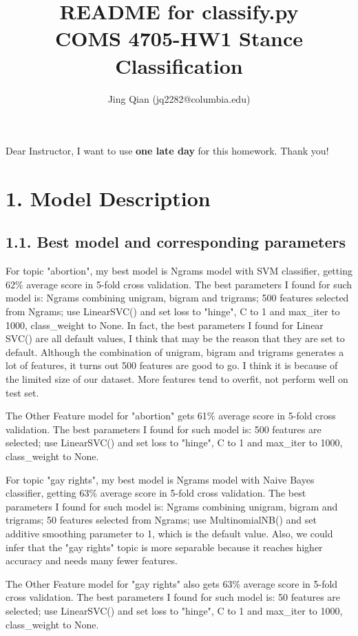 \documentclass{article}
\title{README for classify.py\\COMS 4705-HW1 Stance Classification}
\author{Jing Qian (jq2282@columbia.edu)}
\begin{document}
\maketitle

Dear Instructor, I want to use \textbf{one late day} for this homework. Thank you!

\section*{1. Model Description}
\subsection*{1.1. Best model and corresponding parameters}
For topic "abortion", my best model is Ngrams model with SVM classifier, getting 62\% average score in 5-fold cross validation. The best parameters I found for such model is: Ngrams combining unigram, bigram and trigrams; 500 features selected from Ngrams; use LinearSVC() and set loss to "hinge", C to 1 and max\_iter to 1000, class\_weight to None. In fact, the best parameters I found for Linear SVC() are all default values, I think that may be the reason that they are set to default. Although the combination of unigram, bigram and trigrams generates a lot of features, it turns out 500 features are good to go. I think it is because of the limited size of our dataset. More features tend to overfit, not perform well on test set.

The Other Feature model for "abortion"  gets 61\% average score in 5-fold cross validation. The best parameters I found for such model is: 500  features are selected; use LinearSVC() and set loss to "hinge", C to 1 and max\_iter to 1000, class\_weight to None. 

For topic "gay rights", my best model is Ngrams model with Naive Bayes classifier, getting  63\% average score in 5-fold cross validation. The best parameters I found for such model is: Ngrams combining unigram, bigram and trigrams; 50 features selected from Ngrams; use MultinomialNB() and set additive smoothing parameter to 1, which is the default value. Also, we could infer that the "gay rights" topic is more separable because it reaches higher accuracy and needs many fewer features.

The Other Feature model for "gay rights" also gets 63\% average score in 5-fold cross validation. The best parameters I found for such model is: 50  features are selected; use LinearSVC() and set loss to "hinge", C to 1 and max\_iter to 1000, class\_weight to None. 
\end{document}
